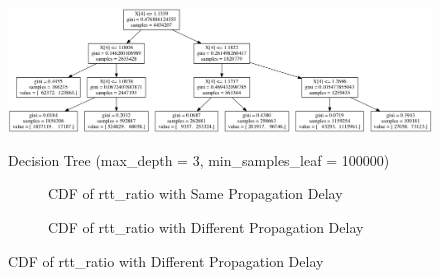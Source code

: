 \begin{figure}
\centering
  \includegraphics[width=\textwidth,height=4cm]{tree.png}
  \caption{Decision Tree (max\_depth = 3, min\_samples\_leaf = 100000)}
  \label{DT}
\end{figure}

\begin{figure}[!htb]\centering
   \begin{subfigure}{0.49\textwidth}
\caption{CDF of rtt\_ratio with Same Propagation Delay}
\label{CDFrtt}

   \end{subfigure}
   \begin {subfigure}{0.49\textwidth}
\caption{CDF of rtt\_ratio with Different Propagation Delay}
\label{CDFrttDiff}
   \end{subfigure}
\end{figure}




